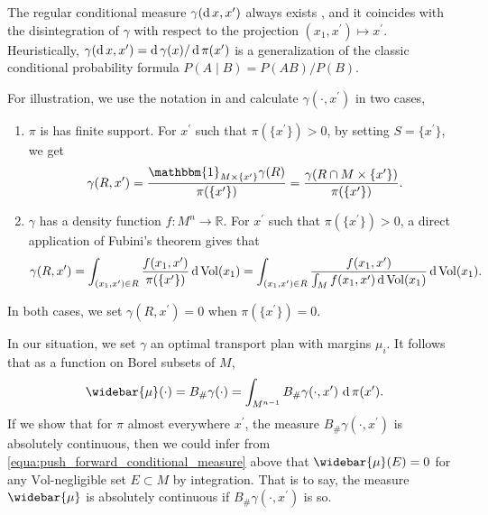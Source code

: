 The regular conditional measure $\gamma(\operatorname{d} x , x^\prime)$ always exists \cite[Corollary 10.4.10]{Bogachev2007},
and it coincides with the disintegration \cite[Section 10.6]{Bogachev2007} of $\gamma$
with respect to the projection $(x_1, x^\prime) \mapsto x^\prime$.
Heuristically, $\gamma(\operatorname{d} x , x^\prime) = \operatorname{d} \gamma(x) / \operatorname{d} \pi (x^\prime)$ is a generalization of
the classic conditional probability formula $P(A \mid B) = P(A B) / P(B)$.
\begin{example}
	\label{example:regular_conditional_measure}
	For illustration, we use the notation in  and
	calculate $\gamma(\cdot , x^\prime)$ in two cases,
	\begin{enumerate}
		\item $\pi$ is has finite support.
		      For $x^\prime$ such that $\pi(\{x^\prime\}) >0$, by setting $S=\{x^\prime\}$, we get
		      \[
			      \gamma(R , x^\prime) =
			      \frac{
				      \mathbbm{1}_{M \times \{x^\prime\}}
				      \gamma(R)
			      }{\pi(\{x^\prime\})} =
			      \frac{\gamma(R \cap M \times \{x^\prime\})
			      }{\pi(\{x^\prime\})}.
		      \]
		\item $\gamma$ has a density function $f: M^n \rightarrow \mathbb{R} $.
		      For $x^\prime$ such that
		      $\pi (\{ x^\prime\}) > 0 $,
		      a direct application of Fubini's theorem gives that
		      \[
			      \gamma(R , x^\prime) =
			      \int_{(x_1, x^\prime) \in R}
			      \frac{f(x_1, x^\prime)} {\pi(\{x^\prime\})}
			      \operatorname{d} \operatorname{Vol}(x_1)=
			      \int_{(x_1, x^\prime) \in R} \frac{ f(x_1, x^\prime)} {\int_{M} f(x_1, x^\prime) \operatorname{d} \operatorname{Vol}(x_1)}\operatorname{d} \operatorname{Vol}(x_1).
		      \]
	\end{enumerate}
	In both cases, we set $\gamma(R, x^\prime)=0$ when $\pi(\{x^\prime\})=0$.
\end{example}

In our situation, we set $\gamma$ an optimal transport plan with margins $\mu_i$.
It follows that as a function on Borel subsets of $M$,
\begin{equation}
	\label{equa:push_forward_conditional_measure}
	\widebar{\mu}(\cdot) = B_{\#} \gamma (\cdot)= \int_{M^{n-1}} B_{\#} \gamma(\cdot , x^\prime)\, \diff \pi(x^\prime).
\end{equation}
If we show that for $\pi$ almost everywhere $x^\prime$, the measure
$B_{\#} \gamma(\cdot , x^\prime)$ is absolutely continuous,
then we could infer from \cref{equa:push_forward_conditional_measure} above that
$\widebar{\mu}(E)=0$ for any $\text{Vol}$-negligible set $E \subset M$ by integration.
That is to say, the measure $\widebar{\mu}$ is absolutely continuous
if $B_{\#}\gamma(\cdot, x^\prime)$ is so.

